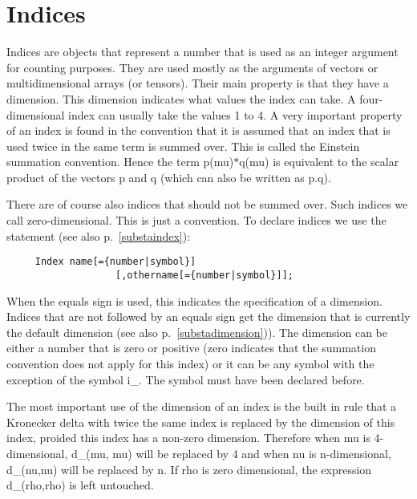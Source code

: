 \section{Indices}

\label{sect-indices}
Indices are objects that represent a number 
that is used as an integer argument for counting purposes. They are used 
mostly as the arguments of vectors or multidimensional arrays (or tensors). 
Their main property is that they have a dimension. This 
dimension indicates what values the index can take. A four-dimensional 
index can usually take the values 1 to 4. A very important property of an 
index is found in the convention that it is assumed that an index that is 
used twice in the same term is summed over. This is called the 
Einstein summation convention. 
Hence the term p(mu)$*$q(mu) is equivalent to the scalar product of the 
vectors p and q (which can also be written as p.q). 

There are of course also indices that should not be summed over. 
Such indices we call zero-dimensional. This is just a convention. 
To declare indices we use the statement (see also p.~\ref{substaindex}): 
\begin{verbatim}
     Index name[={number|symbol}]
                   [,othername[={number|symbol}]];
\end{verbatim}
When the equals sign is used, this indicates the specification of a 
dimension. Indices that are not followed by an equals sign get the 
dimension that is currently the default dimension (see also 
p.~\ref{substadimension})). The dimension can be either a number that is 
zero or positive (zero indicates that the summation convention does not 
apply for this index) or it can be any symbol with the exception of the 
symbol i\_. The symbol must have been declared before. 

The most important use of the dimension of an index is the built in rule 
that a Kronecker delta with twice 
the same index is replaced by the dimension of this index, proided this 
index has a non-zero dimension. Therefore when mu is 4-dimensional, d\_(mu,
mu) will be replaced by 4 and when nu is n-dimensional, d\_(nu,nu) will be 
replaced by n. If rho is zero dimensional, the expression d\_(rho,rho) is 
left untouched.

